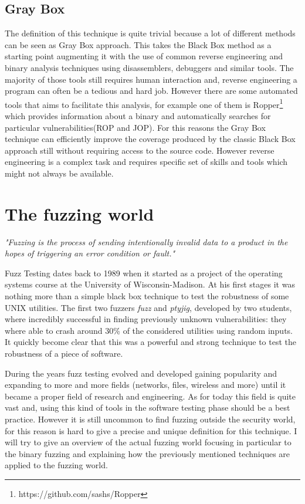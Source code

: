 \documentclass[../main.tex]{subfiles}
\begin{document}
\subsection{Gray Box}

The definition of this technique is quite trivial because a lot of different
methods can be seen as Gray Box approach. This takes the Black Box method as a
starting point augmenting it with the use of common reverse engineering and
binary analysis techniques using disassemblers, debuggers and similar tools. The
majority of those tools still requires human interaction and, reverse
engineering a program can often be a tedious and hard job. However there are
some automated tools that aims to facilitate this analysis, for example one of
them is Ropper\footnote{https://github.com/sashs/Ropper} which provides
information about a binary and automatically searches for particular
vulnerabilities(ROP and JOP). For this reasons the Gray Box technique can
efficiently improve the coverage produced by the classic Black Box approach
still without requiring access to the source code. However reverse
engineering is a complex task and requires specific set of skills and tools
which might not always be available.

\section{The fuzzing world}

\textit{"Fuzzing is the process of sending intentionally invalid data to a
product in the hopes of triggering an error condition or fault."}
\cite{Sutton2007}

Fuzz Testing dates back to 1989 when it started as a project of the operating
systems course at the University of Wisconsin-Madison. At his first stages it
was nothing more than a simple black box technique to test the robustness of
some UNIX utilities. The first two fuzzers \textit{fuzz} and \textit{ptyjig},
developed by two students, where incredibly successful in finding previously
unknown vulnerabilities: they where able to crash around 30\% of the considered
utilities using random inputs\cite{firstFuzzPaper}.
It quickly become clear that this was a powerful and strong technique to test
the robustness of a piece of software.

During the years fuzz testing evolved and developed gaining popularity and
expanding to more and more fields (networks, files, wireless and more) until it
became a proper field of research and engineering. As for today this field is
quite vast and, using this kind of tools in the software testing phase should be a best practice. However it is still uncommon to find fuzzing
outside the security world, for this reason is hard to give a precise and unique
definition for this technique. I will try to give an overview of the actual fuzzing world focusing in particular to the binary fuzzing and explaining how the previously mentioned techniques are applied to the fuzzing world.
\end{document}
